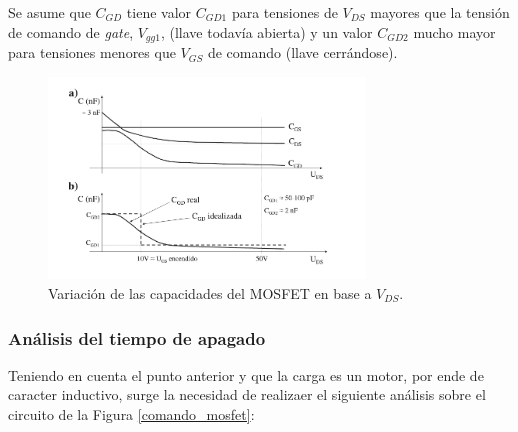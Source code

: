 \documentclass[10pt,a4paper]{article}
\begin{document}
Se asume que $C_{GD}$ tiene valor $C_{GD1}$ para tensiones de $V_{DS}$ mayores
que la tensión de comando de \emph{gate}, $V_{gg1}$, (llave todavía abierta) y
un valor $C_{GD2}$ mucho mayor para tensiones menores que $V_{GS}$ de comando
(llave cerrándose)\cite{Mohan1989}.

\begin{figure}[h!]
	\begin{center}
		\includegraphics[width=0.75\textwidth]{Capacitor_vs_Vds.pdf}
		\caption{Variación de las capacidades del MOSFET en base a $V_{DS}$.}
		\label{aprox_CGD}
	\end{center}
\end{figure}
\FloatBarrier

\subsubsection{Análisis del tiempo de apagado}

Teniendo en cuenta el punto anterior y que la carga es un motor, por ende de 
caracter inductivo, surge la necesidad de realizaer el siguiente análisis sobre 
el circuito de la Figura \ref{comando_mosfet}:
\end{document}
